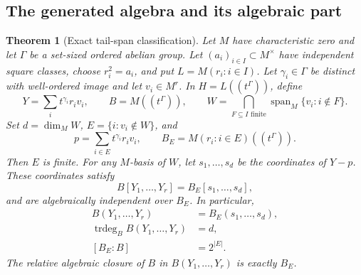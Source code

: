 \documentclass[11pt,a4paper]{article}
\numberwithin{equation}{section}
\newtheorem{theorem}{Theorem}[section]
\theoremstyle{definition}
\theoremstyle{remark}
\newcommand{\Span}{\operatorname{span}}
\newcommand{\trdeg}{\operatorname{trdeg}}
\begin{document}
\subsection{The generated algebra and its algebraic part}
\begin{theorem}[Exact tail-span classification]\label{tail:thm:tail}
Let $M$ have characteristic zero and let $\Gamma$ be a set-sized ordered
abelian group. Let $(a_i)_{i\in I}\subset M^\times$ have independent square
classes, choose $r_i^2=a_i$, and put $L=M(r_i:i\in I)$.
Let $\gamma_i\in\Gamma$ be distinct with well-ordered image and let
$v_i\in M^r$. In $H=L((t^\Gamma))$, define
\[
 Y=\sum_i t^{\gamma_i}r_iv_i,\qquad B=M((t^\Gamma)),
 \qquad W=\bigcap_{F\subseteq I\text{ finite}}
                     \Span_M\{v_i:i\notin F\}.
\]
Set $d=\dim_M W$, $E=\{i:v_i\notin W\}$, and
\[
 p=\sum_{i\in E}t^{\gamma_i}r_iv_i,
 \qquad B_E=M(r_i:i\in E)((t^\Gamma)).
\]
Then $E$ is finite. For any $M$-basis of $W$, let $s_1,\ldots,s_d$ be
the coordinates of $Y-p$. These coordinates satisfy
\begin{equation}\label{tail:eq:algebraclassification}
 B[Y_1,\ldots,Y_r]=B_E[s_1,\ldots,s_d],
\end{equation}
and are algebraically independent over $B_E$. In particular,
\begin{align}
 B(Y_1,\ldots,Y_r)&=B_E(s_1,\ldots,s_d),\label{tail:eq:fieldclassification}\\
 \trdeg_B B(Y_1,\ldots,Y_r)&=d,\label{tail:eq:trdegree}\\
 [B_E:B]&=2^{|E|}.\label{tail:eq:exceptiondegree}
\end{align}
The relative algebraic closure of $B$ in $B(Y_1,\ldots,Y_r)$ is exactly
$B_E$.
\end{theorem}
\end{document}
